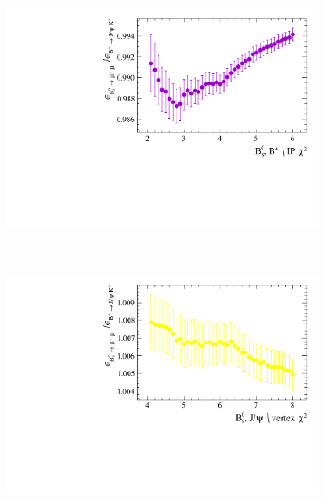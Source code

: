 \begin{figure}[htbp]
    \centering
    \begin{subfigure}[b]{0.4\textwidth}
        \includegraphics[width=\textwidth]{./Figs/Selection/BsMuMu_JPsiK_IP.pdf}
    \end{subfigure}
    ~ %
    \begin{subfigure}[b]{0.4\textwidth}
        \includegraphics[width=\textwidth]{./Figs/Selection/BsMuMu_JpsiK_vertex.pdf}
    \end{subfigure}
    ~ %


\end{figure}
